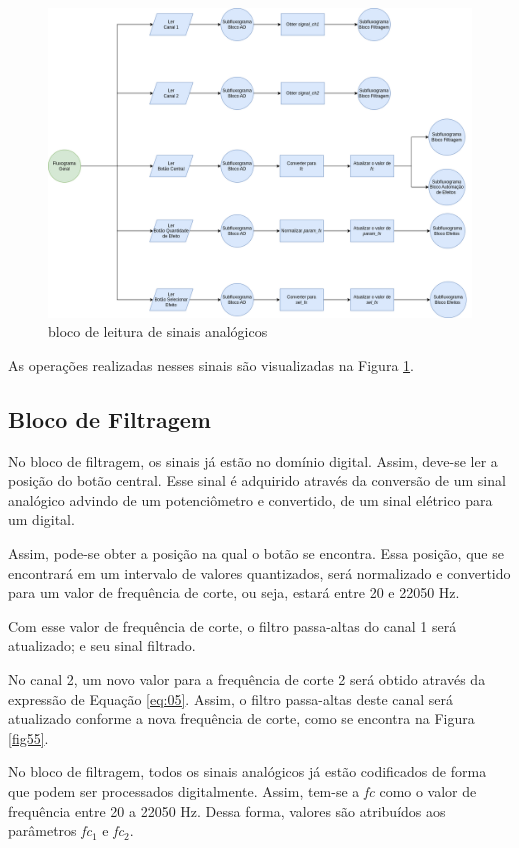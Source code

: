 \begin{figure}[h]
    \centering
    \includegraphics[width=\textwidth]{figuras/fig54.png}
    \caption{bloco de leitura de sinais analógicos}
    \label{fig54}
\end{figure}

As operações realizadas nesses sinais são visualizadas na Figura \ref{fig54}.

\subsection{Bloco de Filtragem}

No bloco de filtragem, os sinais já estão no domínio digital. Assim, deve-se ler a posição do botão central. Esse sinal é adquirido através da conversão de um sinal analógico advindo de um potenciômetro e convertido, de um sinal elétrico para um digital. 

Assim, pode-se obter a posição na qual o botão se encontra. Essa posição, que se encontrará em um intervalo de valores quantizados, será normalizado e convertido para um valor de frequência de corte, ou seja, estará entre 20 e 22050 Hz.

Com esse valor de frequência de corte, o filtro passa-altas do canal 1 será atualizado; e seu sinal filtrado. 

No canal 2, um novo valor para a frequência de corte 2 será obtido através da expressão de Equação \ref{eq:05}. Assim, o filtro passa-altas deste canal será atualizado conforme a nova frequência de corte, como se encontra na Figura \ref{fig55}. 

No bloco de filtragem, todos os sinais analógicos já estão codificados de forma que podem ser processados digitalmente. Assim, tem-se a \textit{fc} como o valor de frequência entre 20 a 22050 Hz. Dessa forma, valores são atribuídos aos parâmetros \textit{fc$_{1}$} e \textit{fc$_{2}$}.

